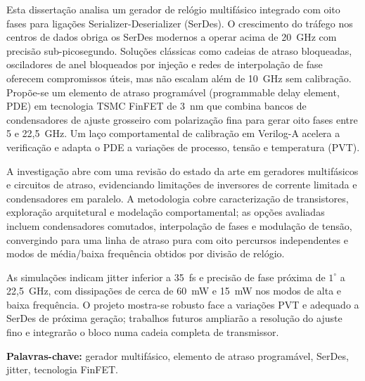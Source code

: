 Esta dissertação analisa um gerador de relógio multifásico integrado com oito fases para ligações Serializer-Deserializer (SerDes). O crescimento do tráfego nos centros de dados obriga os SerDes modernos a operar acima de 20~GHz com precisão sub-picosegundo. Soluções clássicas como cadeias de atraso bloqueadas, osciladores de anel bloqueados por injeção e redes de interpolação de fase oferecem compromissos úteis, mas não escalam além de 10~GHz sem calibração. Propõe-se um elemento de atraso programável (programmable delay element, PDE) em tecnologia TSMC FinFET de 3~nm que combina bancos de condensadores de ajuste grosseiro com polarização fina para gerar oito fases entre 5 e 22{,}5~GHz. Um laço comportamental de calibração em Verilog-A acelera a verificação e adapta o PDE a variações de processo, tensão e temperatura (PVT).

A investigação abre com uma revisão do estado da arte em geradores multifásicos e circuitos de atraso, evidenciando limitações de inversores de corrente limitada e condensadores em paralelo. A metodologia cobre caracterização de transistores, exploração arquitetural e modelação comportamental; as opções avaliadas incluem condensadores comutados, interpolação de fases e modulação de tensão, convergindo para uma linha de atraso pura com oito percursos independentes e modos de média/baixa frequência obtidos por divisão de relógio.

As simulações indicam jitter inferior a 35~fs e precisão de fase próxima de $1^{\circ}$ a 22{,}5~GHz, com dissipações de cerca de 60~mW e 15~mW nos modos de alta e baixa frequência. O projeto mostra-se robusto face a variações PVT e adequado a SerDes de próxima geração; trabalhos futuros ampliarão a resolução do ajuste fino e integrarão o bloco numa cadeia completa de transmissor.

\medskip
\noindent\textbf{Palavras-chave:} gerador multifásico, elemento de atraso programável, SerDes, jitter, tecnologia FinFET.
